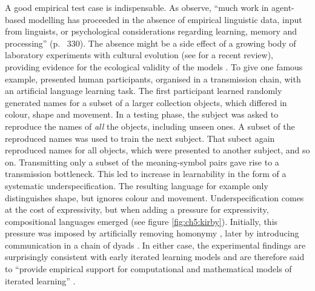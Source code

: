 \documentclass{../src/bcthesispart}
\begin{document}
A good empirical test case is indispensable. 
As \textcite{Dediu2013} observe, “much work in agent-based modelling has proceeded in the absence of empirical linguistic data, input from linguists, or psychological considerations regarding learning, memory and processing” (p.~ 330).
The absence might be a side effect of a growing body of laboratory experiments with cultural evolution (see \textcite{Tamariz2017} for a recent review), providing evidence for the ecological validity of the models \parencite{Smith2014}.
To give one famous example, \textcite{Kirby2008} presented human participants, organised in a transmission chain, with an artificial language learning task.
The first participant learned randomly generated names for a subset of a larger collection objects, which differed in colour, shape and movement.
In a testing phase, the subject was asked to reproduce the names of \emph{all} the objects, including unseen ones.
A subset of the reproduced names was used to train the next subject.
That subect again reproduced names for all objects, which were presented to another subject, and so on.
Transmitting only a subset of the meaning-symbol pairs gave rise to a transmission bottleneck.
This led to increase in learnability in the form of a systematic underspecification.
The resulting language for example only distinguishes shape, but ignores colour and movement.
Underspecification comes at the cost of expressivity, but when adding a pressure for expressivity, compositional languages emerged (see figure \ref{fig:ch5:kirby}).
Initially, this pressure was imposed by artificially removing homonymy \parencite{Kirby2008}, later by introducing communication in a chain of dyads \parencite{Kirby2015}.
In either case, the experimental findings are surprisingly consistent with early iterated learning models and are therefore said to “provide empirical support for computational and mathematical models of iterated learning” \parencite{Kirby2008}.
\end{document}
